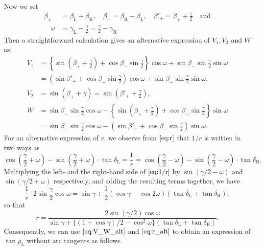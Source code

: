 \documentclass[11pt]{amsart}
\numberwithin{equation}{section}
\numberwithin{theorem}{section}
\newcommand{\Lt}{\ensuremath{\mathrm{L}}}
\newcommand{\Rt}{\ensuremath{\mathrm{R}}}
\begin{document}
Now we set
\begin{align*}
\beta_+&=\beta_\Lt +\beta_\Rt ,\quad\beta_-=\beta_\Rt -\beta_\Lt ,\quad\beta'_+=\beta_++\frac{\gamma}{2}\quad\text{and}\\
\quad\omega&=\gamma_\Lt -\frac{\gamma}{2}=\frac{\gamma}{2}-\gamma_\Rt .
\end{align*}
Then a straightforward calculation gives an alternative expression of $V_1,V_2$ and $W$ as
\begin{equation}\label{eq:V_W_alt}
\begin{aligned}
V_1&=\left\{\sin\left(\beta_++\frac{\gamma}{2}\right) +\cos\beta_-\sin\frac{\gamma}{2}\right\}\cos\omega +\sin\beta_-\sin\frac{\gamma}{2}\sin\omega\\
&=\left(\sin\beta'_++\cos\beta_-\sin\frac{\gamma}{2}\right)\cos\omega +\sin\beta_-\sin\frac{\gamma}{2}\sin\omega ,\\
V_2&=\sin (\beta_++\gamma )=\sin\left(\beta'_++\frac{\gamma}{2}\right),\\
W&=\sin\beta_-\sin\frac{\gamma}{2}\cos\omega -\left\{\sin\left(\beta_++\frac{\gamma}{2}\right)+\cos\beta_-\sin\frac{\gamma}{2}\right\}\sin\omega\\
&=\sin\beta_-\sin\frac{\gamma}{2}\cos\omega -\left(\sin\beta'_++\cos\beta_-\sin\frac{\gamma}{2}\right)\sin\omega .
\end{aligned}
\end{equation}
For an alternative expression of $r$, we observe from $\eqref{eq:r}$ that $1/r$ is written in two ways as
\begin{equation}\label{eq:1/r}
\cos\left(\frac{\gamma}{2}+\omega\right)-\sin\left(\frac{\gamma}{2}+\omega\right)\cdot\tan\delta_\Lt
=\frac{1}{r}=\cos\left(\frac{\gamma}{2}-\omega\right)-\sin\left(\frac{\gamma}{2}-\omega\right)\cdot\tan\delta_\Rt .
\end{equation}
Multiplying the left- and the right-hand side of $\eqref{eq:1/r}$ by $\sin (\gamma /2-\omega)$ and $\sin (\gamma /2+\omega )$ respectively,
and adding the resulting terms together, we have
\begin{equation*}
\frac{1}{r}\cdot 2\sin\frac{\gamma}{2}\cos\omega =\sin\gamma +\frac{1}{2}(\cos\gamma -\cos 2\omega )(\tan\delta_\Lt +\tan\delta_\Rt ),
\end{equation*}
so that
\begin{equation}\label{eq:r_alt}
r=\frac{2\sin (\gamma /2)\cos\omega}{\sin\gamma +\{(1+\cos\gamma )/2-\cos^2\omega\} (\tan\delta_\Lt +\tan\delta_\Rt )}.
\end{equation}
Consequently, we can use $\eqref{eq:V_W_alt}$ and $\eqref{eq:r_alt}$ to obtain an expression of $\tan\rho_\Lt$ without arc tangents as follows.
\end{document}
